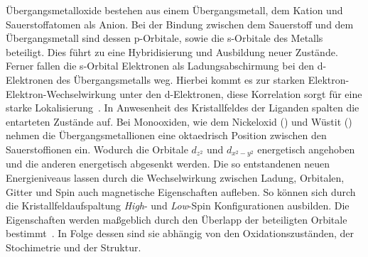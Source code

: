         Übergangsmetalloxide bestehen aus einem Übergangsmetall, dem Kation und Sauerstoffatomen als Anion.
        Bei der Bindung zwischen dem Sauerstoff und dem Übergangsmetall sind dessen p-Orbitale, sowie die s-Orbitale des Metalls beteiligt.
        Dies führt zu eine Hybridisierung und Ausbildung neuer Zustände.
        Ferner fallen die s-Orbital Elektronen als Ladungsabschirmung bei den d-Elektronen des Übergangsmetalls weg.
        Hierbei kommt es zur starken Elektron-Elektron-Wechselwirkung unter den d-Elektronen, diese Korrelation sorgt für eine starke Lokalisierung~\cite{dane_beschreibung_2008}.
        In Anwesenheit des Kristallfeldes der Liganden spalten die entarteten Zustände auf.
        Bei Monooxiden, wie dem Nickeloxid () und Wüstit () nehmen die Übergangsmetallionen eine oktaedrisch Position zwischen den Sauerstoffionen ein.
        Wodurch die Orbitale $d_{z^2}$ und $d_{x^2-y^2}$ energetisch angehoben und die anderen energetisch abgesenkt werden.
        Die so entstandenen neuen Energieniveaus lassen durch die Wechselwirkung zwischen Ladung, Orbitalen, Gitter und Spin auch magnetische Eigenschaften aufleben.
        So können sich durch die Kristallfeldaufspaltung \textit{High}- und \textit{Low}-Spin Konfigurationen ausbilden.
        Die Eigenschaften werden maßgeblich durch den Überlapp der beteiligten Orbitale bestimmt~\cite{kupper_electronic_2005}.
        In Folge dessen sind sie abhängig von den Oxidationszuständen, der Stochimetrie und der Struktur.

